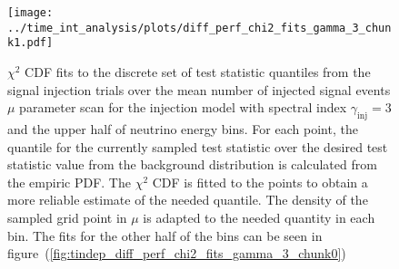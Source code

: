 \begin{figure}[H]
  \centering
  \texttt{[image: ../time\_int\_analysis/plots/diff\_perf\_chi2\_fits\_gamma\_3\_chunk1.pdf]}
  \caption[$\chi^2$ CDF fits for the time-integrated diff. performance, $\gamma_\text{inj}=3$ -- part 2]{
     $\chi^2$ CDF fits to the discrete set of test statistic quantiles from the signal injection trials over the mean number of injected signal events $\mu$ parameter scan for the injection model with spectral index $\gamma_\text{inj}=3$ and the upper half of neutrino energy bins.
     For each point, the quantile for the currently sampled test statistic over the desired test statistic value from the background distribution is calculated from the empiric PDF.
     The $\chi^2$ CDF is fitted to the points to obtain a more reliable estimate of the needed quantile.
     The density of the sampled grid point in $\mu$ is adapted to the needed quantity in each bin.
     The fits for the other half of the bins can be seen in figure~(\ref{fig:tindep_diff_perf_chi2_fits_gamma_3_chunk0})
  }
  \label{fig:tindep_diff_perf_chi2_fits_gamma_3_chunk1}
\end{figure}

